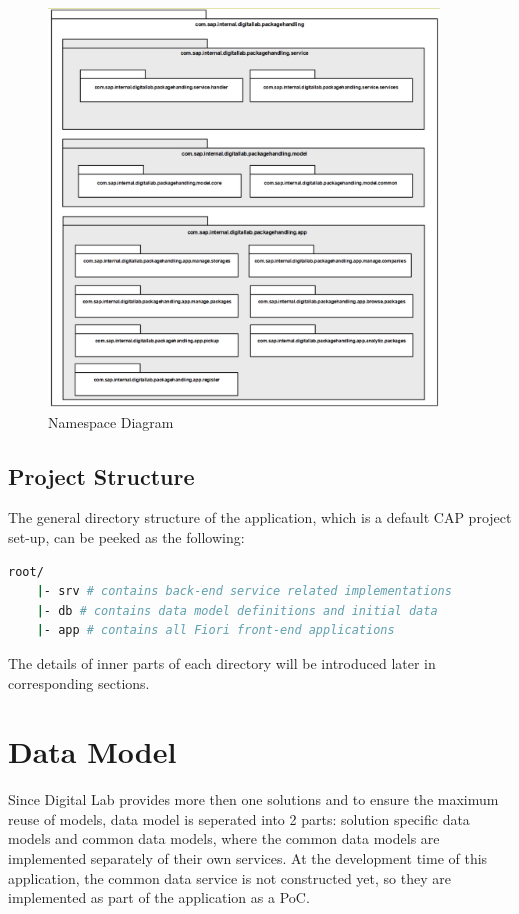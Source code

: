\begin{figure}[H]
	\centering
	\includegraphics[height=400px]{images/Package_Diagram.png}
	\caption{Namespace Diagram}
	\label{fig:packStruc}
\end{figure}


\subsection{Project Structure}

The general directory structure of the application, which is a default CAP project set-up, can be peeked as the following:

\begin{lstlisting}[language={bash}]
root/
    |- srv # contains back-end service related implementations
    |- db # contains data model definitions and initial data
    |- app # contains all Fiori front-end applications
\end{lstlisting}

The details of inner parts of each directory will be introduced later in corresponding sections.

\section{Data Model}
Since Digital Lab provides more then one solutions and to ensure the maximum reuse of models, data model is seperated into 2 parts: solution specific data models and common data models, where the common data models are implemented separately of their own services. At the development time of this application, the common data service is not constructed yet, so they are implemented as part of the application as a PoC.

